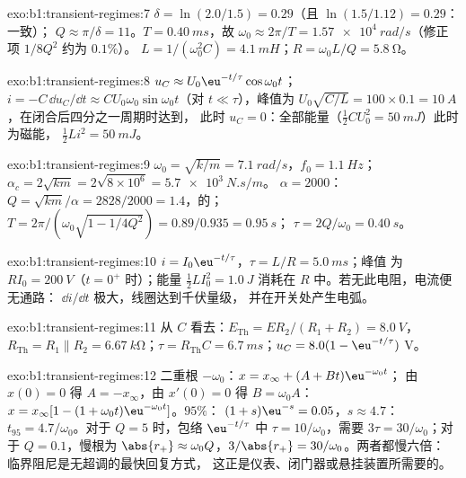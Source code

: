 \begin{solution}{exo:b1:transient-regimes:7}
$\delta = \ln(2.0/1.5) = 0.29$（且 $\ln(1.5/1.12) = 0.29$：一致）；
$Q \approx \pi/\delta = 11$。$T = \qty{0.40}{ms}$，故 $\omega_0 \approx
2\pi/T = \qty{1.57e4}{rad/s}$（修正项 $1/8Q^2$ 约为 $0.1\%$）。
$L = 1/(\omega_0^2 C) = \qty{4.1}{mH}$；$R = \omega_0 L/Q = \qty{5.8}{\ohm}$。
\end{solution}

\begin{solution}{exo:b1:transient-regimes:8}
$u_C \approx U_0\eu^{-t/\tau}\cos\omega_0 t$；$i = -C\,\dd u_C/\dd t
\approx CU_0\omega_0\sin\omega_0 t$（对 $t \ll \tau$），峰值为 $U_0\sqrt{C/L}
= 100 \times 0.1 = \qty{10}{A}$，在闭合后四分之一周期时达到，
此时 $u_C = 0$：全部能量（$\tfrac12 CU_0^2 = \qty{50}{mJ}$）此时为磁能，
$\tfrac12 Li^2 = \qty{50}{mJ}$。
\end{solution}

\begin{solution}{exo:b1:transient-regimes:9}
$\omega_0 = \sqrt{k/m} = \qty{7.1}{rad/s}$，$f_0 = \qty{1.1}{Hz}$；
$\alpha_c = 2\sqrt{km} = 2\sqrt{8\times10^6} = \qty{5.7e3}{N.s/m}$。
$\alpha = 2000$：$Q = \sqrt{km}/\alpha = 2828/2000 = 1.4$，的；
$T = 2\pi/(\omega_0\sqrt{1 - 1/4Q^2}) = 0.89/0.935 = \qty{0.95}{s}$；
$\tau = 2Q/\omega_0 = \qty{0.40}{s}$。
\end{solution}

\begin{solution}{exo:b1:transient-regimes:10}
$i = I_0\eu^{-t/\tau}$，$\tau = L/R = \qty{5.0}{ms}$；峰值
为 $RI_0 = \qty{200}{V}$（$t = 0^+$ 时）；能量 $\tfrac12 LI_0^2 = \qty{1.0}{J}$
消耗在 $R$ 中。若无此电阻，电流便无通路：
$\dd i/\dd t$ 极大，线圈达到千伏量级，
并在开关处产生电弧。
\end{solution}

\begin{solution}{exo:b1:transient-regimes:11}
从 $C$ 看去：$E_{\mathrm{Th}} = ER_2/(R_1 + R_2) = \qty{8.0}{V}$，
$R_{\mathrm{Th}} = R_1 \parallel R_2 = \qty{6.67}{k\ohm}$；$\tau =
R_{\mathrm{Th}}C = \qty{6.7}{ms}$；$u_C = 8.0(1 - \eu^{-t/\tau})$ V。
\end{solution}

\begin{solution}{exo:b1:transient-regimes:12}
二重根 $-\omega_0$：$x = x_\infty + (A + Bt)\eu^{-\omega_0 t}$；
由 $x(0) = 0$ 得 $A = -x_\infty$，由 $x'(0) = 0$ 得 $B = \omega_0 A$：
$x = x_\infty[1 - (1 + \omega_0 t)\eu^{-\omega_0 t}]$。$95\%$：
$(1 + s)\eu^{-s} = 0.05$，$s \approx 4.7$：$t_{95} = 4.7/\omega_0$。对于
$Q = 5$ 时，包络 $\eu^{-t/\tau}$ 中 $\tau = 10/\omega_0$，需要
$3\tau = 30/\omega_0$；对于 $Q = 0.1$，慢根为 $\abs{r_+} \approx
\omega_0 Q$，$3/\abs{r_+} = 30/\omega_0$。两者都慢六倍：
临界阻尼是无超调的最快回复方式，
这正是仪表、闭门器或悬挂装置所需要的。
\end{solution}

